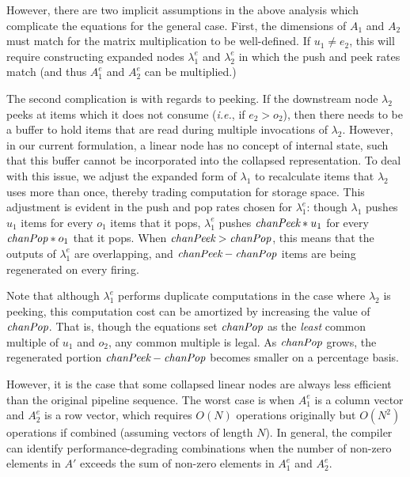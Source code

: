 However, there are two implicit assumptions in the above analysis
which complicate the equations for the general case.  First, the
dimensions of $A_1$ and $A_2$ must match for the matrix multiplication
to be well-defined.  If $u_1 \ne e_2$, this will require constructing
expanded nodes $\lambda_1^e$ and $\lambda_2^e$ in which the push and
peek rates match (and thus $A_1^e$ and $A_2^e$ can be multiplied.)

The second complication is with regards to peeking.  If the downstream
node $\lambda_2$ peeks at items which it does not consume ({\it i.e.},
if $e_2 > o_2$), then there needs to be a buffer to hold items that
are read during multiple invocations of $\lambda_2$.  However, in our
current formulation, a linear node has no concept of internal state,
such that this buffer cannot be incorporated into the collapsed
representation.  To deal with this issue, we adjust the expanded form
of $\lambda_1$ to recalculate items that $\lambda_2$ uses more than
once, thereby trading computation for storage space.  This adjustment
is evident in the push and pop rates chosen for $\lambda_1^e$: though
$\lambda_1$ pushes $u_1$ items for every $o_1$ items that it pops,
$\lambda_1^e$ pushes $\mbox{\it chanPeek}*u_1$ for every $\mbox{\it chanPop}*o_1$
that it pops.  When $\mbox{\it chanPeek}>\mbox{\it chanPop}$, this means that the
outputs of $\lambda_1^e$ are overlapping, and
$\mbox{\it chanPeek}-\mbox{\it chanPop}$ items are being regenerated on every
firing.

Note that although $\lambda_1^e$ performs duplicate computations in
the case where $\lambda_2$ is peeking, this computation cost can be
amortized by increasing the value of $\mbox{\it chanPop}$.  That is, though
the equations set $\mbox{\it chanPop}$ as the {\it least} common multiple of
$u_1$ and $o_2$, any common multiple is legal.  As $\mbox{\it chanPop}$
grows, the regenerated portion $\mbox{\it chanPeek}-\mbox{\it chanPop}$ becomes
smaller on a percentage basis.

However, it is the case that some collapsed linear nodes are always
less efficient than the original pipeline sequence.  The worst case is
when $A_1^e$ is a column vector and $A_2^e$ is a row vector, which
requires $O(N)$ operations originally but $O(N^2)$ operations if
combined (assuming vectors of length $N$).  In general, the
compiler can identify performance-degrading combinations when the
number of non-zero elements in $A'$ exceeds the sum of non-zero
elements in $A_1^e$ and $A_2^e$.

